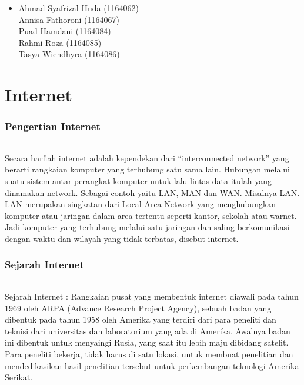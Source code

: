 \documentclass[12pt, a4paper]{article}
\begin{document}
\begin{itemize}
        \item
        Ahmad Syafrizal Huda (1164062) \\
        Annisa Fathoroni (1164067) \\
        Puad Hamdani (1164084) \\
        Rahmi Roza (1164085) \\
        Tasya Wiendhyra (1164086) \\
\end{itemize}

\part{Internet}
\section{Pengertian Internet}
\paragraph{} Secara harfiah internet adalah kependekan dari “interconnected network” yang berarti rangkaian komputer yang terhubung satu sama lain. Hubungan melalui suatu sistem antar perangkat komputer untuk lalu lintas data itulah yang dinamakan network. Sebagai contoh yaitu LAN, MAN dan WAN. Misalnya LAN. LAN merupakan singkatan dari Local Area Network yang menghubungkan komputer atau jaringan dalam area tertentu seperti kantor, sekolah atau warnet. Jadi komputer yang terhubung melalui satu jaringan dan saling berkomunikasi dengan waktu dan wilayah yang tidak terbatas, disebut internet.

\section{Sejarah Internet}
\paragraph{} Sejarah Internet : Rangkaian pusat yang membentuk internet diawali pada tahun 1969 oleh ARPA (Advance Research Project Agency), sebuah badan yang dibentuk pada tahun 1958 oleh Amerika yang terdiri dari para peneliti dan teknisi dari universitas dan laboratorium yang ada di Amerika. Awalnya badan ini dibentuk untuk menyaingi Rusia, yang saat itu lebih maju dibidang satelit. Para peneliti bekerja, tidak harus di satu lokasi, untuk membuat penelitian dan mendedikasikan hasil penelitian tersebut untuk perkembangan teknologi Amerika Serikat.
\end{document}
